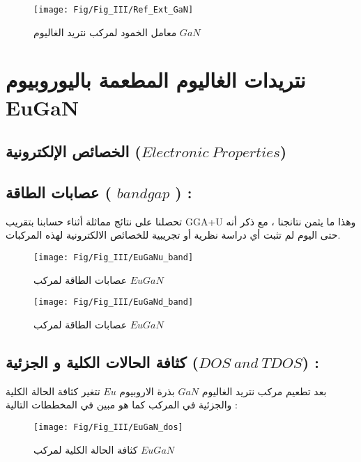 \begin{figure}[h!]
	\centering
	\texttt{[image: Fig/Fig\_III/Ref\_Ext\_GaN]}
	\caption{ معامل الخمود لمركب نتريد الغاليوم  $ GaN $ }
	\label{fig:refextgan}
\end{figure}
\FloatBarrier

\section{  نتريدات الغاليوم المطعمة باليوروبيوم EuGaN }
\subsection{ الخصائص الإلكترونية ($ Electronic~Properties $)  }

\subsection*{ عصابات الطاقة ( $ bandgap $ ) : }
تحصلنا على نتائج مماثلة أثناء حسابنا بتقريب GGA+U وهذا ما يثمن نتانجنا ، مع ذكر أنه حتى اليوم لم تثبت أي دراسة نظرية أو تجريبية للخصائص الالكترونية لهذه المركبات.

\begin{figure}[h!]
	\centering
	\texttt{[image: Fig/Fig\_III/EuGaNu\_band]}
	\caption{ عصابات الطاقة لمركب $  EuGaN $ }
	\label{fig:euganuband}
\end{figure}
\FloatBarrier

\begin{figure}[h!]
	\centering
	\texttt{[image: Fig/Fig\_III/EuGaNd\_band]}
	\caption{ عصابات الطاقة لمركب $  EuGaN $ }
	\label{fig:euganuband}
\end{figure}
\FloatBarrier

\subsection*{كثافة الحالات الكلية و الجزئية ($  DOS~and~TDOS $) : }

بعد تطعيم مركب نتريد الغاليوم $ GaN $ بذرة الاروبيوم $ Eu $ تتغير كثافة الحالة الكلية والجزئية في المركب كما هو مبين في المخططات التالية :

\begin{figure}[h!]
	\centering
	\texttt{[image: Fig/Fig\_III/EuGaN\_dos]}
	\caption{ كثافة الحالة الكلية لمركب $  EuGaN $}
	\label{fig:eugandos}
\end{figure}
\FloatBarrier


